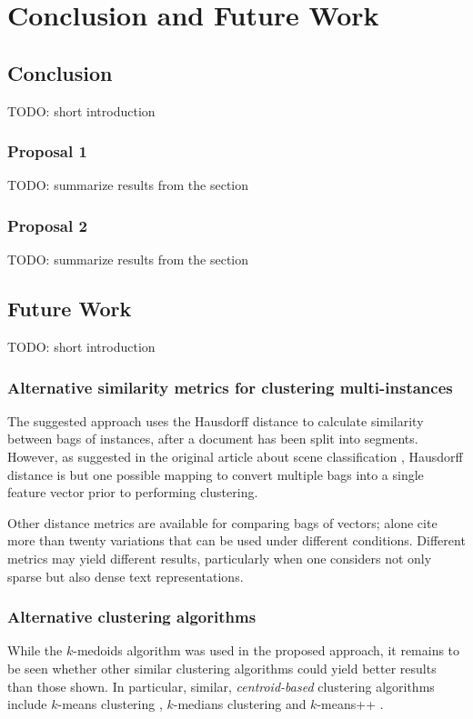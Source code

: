 \chapter{Conclusion and Future Work}\label{chap: conclusion}


\section{Conclusion}

{\color{red} TODO: short introduction}

\subsection{Proposal 1}

{\color{red} TODO: summarize results from the section}

\subsection{Proposal 2}

{\color{red} TODO: summarize results from the section}

\section{Future Work}

{\color{red} TODO: short introduction}

\subsection{Alternative similarity metrics for clustering multi-instances}

The suggested approach uses the Hausdorff distance to calculate similarity between bags of instances, after a document has been split into segments. However, as suggested in the original article about scene classification \citep{zhou_zhang_2006}, Hausdorff distance is but one possible mapping to convert multiple bags into a single feature vector prior to performing clustering. 

Other distance metrics are available for comparing bags of vectors; \cite{huttenlocher_etal_1993} alone cite more than twenty variations that can be used under different conditions. Different metrics may yield different results, particularly when one considers not only sparse but also dense text representations.

\subsection{Alternative clustering algorithms}

While the $k$-medoids algorithm was used in the proposed approach, it remains to be seen whether other similar clustering algorithms could yield better results than those shown. In particular, similar, \textit{centroid-based} clustering algorithms include $k$-means clustering \citep{macqueen_1967}, $k$-medians clustering \citep{jain_dubes_1988} and $k$-means++ \citep{arthur_vassilvitskii_2007}.

